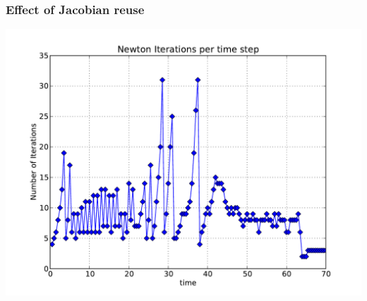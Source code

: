 \begin{frame}
  \frametitle{Effect of Jacobian reuse}

  \begin{center}
    \includegraphics[width=\textwidth]{pdf/newtoniter.pdf}
  \end{center}

\end{frame}
